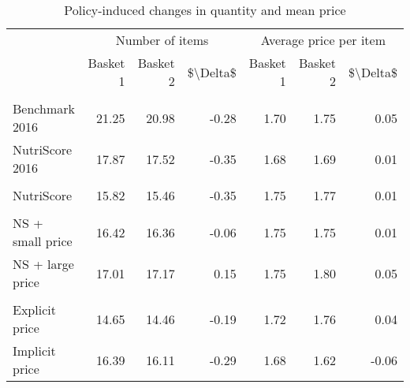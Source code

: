 \begin{table}[!h]

\caption{\label{tab:change_n_prod_NS}Policy-induced changes in quantity and mean price}
\centering
\begin{tabular}[t]{lrrrrrr}
\toprule
\multicolumn{1}{c}{ } & \multicolumn{3}{c}{Number of items} & \multicolumn{3}{c}{Average price per item} \\
\cmidrule(l{3pt}r{3pt}){2-4} \cmidrule(l{3pt}r{3pt}){5-7}
 & Basket 1 & Basket 2 & \$\textbackslash{}Delta\$ & Basket 1 & Basket 2 & \$\textbackslash{}Delta\$\\
\midrule
\addlinespace[0.3em]
\multicolumn{7}{l}{\textbf{Benchmarks}}\\
\hspace{1em}Benchmark 2016 & 21.25 & 20.98 & -0.28 & 1.70 & 1.75 & 0.05\\
\hspace{1em}NutriScore 2016 & 17.87 & 17.52 & -0.35 & 1.68 & 1.69 & 0.01\\
\addlinespace[0.3em]
\multicolumn{7}{l}{\textbf{Labeling}}\\
\hspace{1em}NutriScore & 15.82 & 15.46 & -0.35 & 1.75 & 1.77 & 0.01\\
\addlinespace[0.3em]
\multicolumn{7}{l}{\textbf{Policy mix}}\\
\hspace{1em}NS + small price & 16.42 & 16.36 & -0.06 & 1.75 & 1.75 & 0.01\\
\hspace{1em}NS + large price & 17.01 & 17.17 & 0.15 & 1.75 & 1.80 & 0.05\\
\addlinespace[0.3em]
\multicolumn{7}{l}{\textbf{Price policy}}\\
\hspace{1em}Explicit price & 14.65 & 14.46 & -0.19 & 1.72 & 1.76 & 0.04\\
\hspace{1em}Implicit price & 16.39 & 16.11 & -0.29 & 1.68 & 1.62 & -0.06\\
\bottomrule
\end{tabular}
\end{table}
